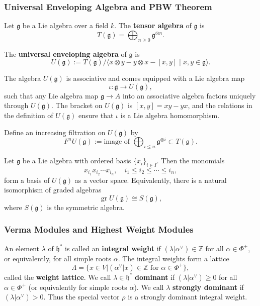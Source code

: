 \documentclass[12pt]{article}
\begin{document}
\subsubsection{Universal Enveloping Algebra and PBW Theorem}
Let $\mathfrak g$ be a Lie algebra over a field $k$. The \textbf{tensor algebra} of $\mathfrak g$ is
\[
    T(\mathfrak g)=\bigoplus_{n\ge 0} \mathfrak g^{\otimes n}.
\]

\begin{definition}
    The \textbf{universal enveloping algebra} of $\mathfrak g$ is
    \[
        U(\mathfrak g) := T(\mathfrak g)\big/\langle x\otimes y - y\otimes x - [x,y] \mid x,y\in \mathfrak g\rangle.
    \]
\end{definition}

    The algebra $U(\mathfrak g)$ is associative and comes equipped with a Lie algebra map
    \[
        \iota:\mathfrak g \to U(\mathfrak g),
    \]
    such that any Lie algebra map $\mathfrak g \to A$ into an associative algebra factors uniquely through $U(\mathfrak g)$. The bracket on $U(\mathfrak g)$ is $[x,y]=xy-yx$, and the relations in the definition of $U(\mathfrak g)$ ensure that $\iota$ is a Lie algebra homomorphism.

Define an increasing filtration on $U(\mathfrak g)$ by
\[
    F^n U(\mathfrak g) := \text{image of } \bigoplus_{i\le n} \mathfrak g^{\otimes i} \subset T(\mathfrak g).
\]


\begin{theorem}
    Let $\mathfrak g$ be a Lie algebra with ordered basis $\{x_i\}_{i\in I}$. Then the monomials
    \[
        x_{i_1}x_{i_2}\cdots x_{i_n}, \quad i_1 \le i_2 \le \cdots \le i_n,
    \]
    form a basis of $U(\mathfrak g)$ as a vector space. Equivalently, there is a natural isomorphism of graded algebras
    \[
        \operatorname{gr} U(\mathfrak g) \cong S(\mathfrak g),
    \]
    where $S(\mathfrak g)$ is the symmetric algebra.
\end{theorem}

\subsubsection{Verma Modules and Highest Weight Modules}


An element $\lambda$ of $\mathfrak{h}^*$ is called an \textbf{integral weight} if $(\lambda|\alpha^\vee) \in \mathbb{Z}$ for all $\alpha \in \Phi^+$, or equivalently, for all simple roots $\alpha$. The integral weights form a lattice
\[
    \Lambda = \{x \in V | (\alpha^\vee|x) \in \mathbb{Z} \text{ for } \alpha \in \Phi^+ \},
\]
called the \textbf{weight lattice}. We call $\lambda \in \mathfrak{h}^*$ \textbf{dominant} if $(\lambda|\alpha^\vee) \geq 0$ for all $\alpha \in \Phi^+$ (or equivalently for simple roots $\alpha$). We call $\lambda$ \textbf{strongly dominant} if $(\lambda|\alpha^\vee) > 0$. Thus the special vector $\rho$ is a strongly dominant integral weight.
\end{document}
